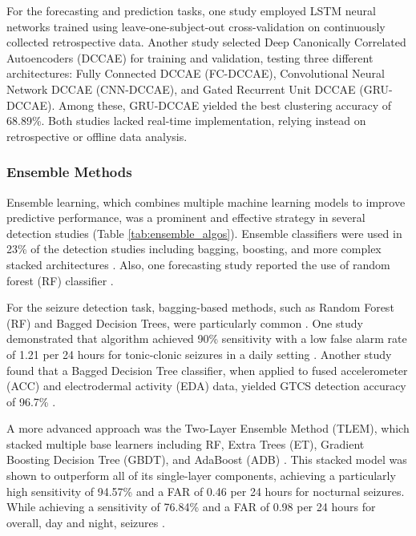 For the forecasting and prediction tasks, one study \cite{Meisel2020-ii} employed LSTM neural networks trained using leave-one-subject-out cross-validation on continuously collected retrospective data. Another study \cite{Vieluf2023-ta} selected Deep Canonically Correlated Autoencoders (DCCAE) for training and validation, testing three different architectures: Fully Connected DCCAE (FC-DCCAE), Convolutional Neural Network DCCAE (CNN-DCCAE), and Gated Recurrent Unit DCCAE (GRU-DCCAE). Among these, GRU-DCCAE yielded the best clustering accuracy of 68.89\%. Both studies lacked real-time implementation, relying instead on retrospective or offline data analysis.


\subsubsection{Ensemble Methods}
Ensemble learning, which combines multiple machine learning models to improve predictive performance, was a prominent and effective strategy in several detection studies (Table \ref{tab:ensemble_algos}). Ensemble classifiers were used in 23\% of the detection studies  including bagging, boosting, and more complex stacked architectures \cite{Wang2022-lt, Chowdhury2022-bi, Vakilna2024-hk, Dong2022-oo, Jiang2022-zu, Wu2024-yl}. Also, one forecasting study reported the use of random forest (RF) classifier \cite{Vieluf2023-zv}.

For the seizure detection task, bagging-based methods, such as Random Forest (RF) and Bagged Decision Trees, were particularly common \cite{Chowdhury2022-bi, Wang2022-lt, Wu2024-yl, Vakilna2024-hk}. One study demonstrated that  algorithm achieved 90\% sensitivity with a low false alarm rate of 1.21 per 24 hours for tonic-clonic seizures in a daily setting \cite{Wang2022-lt}. Another study found that a Bagged Decision Tree classifier, when applied to fused accelerometer (ACC) and electrodermal activity (EDA) data, yielded GTCS detection accuracy of 96.7\% \cite{Chowdhury2022-bi}.

A more advanced approach was the Two-Layer Ensemble Method (TLEM), which stacked multiple base learners including RF, Extra Trees (ET), Gradient Boosting Decision Tree (GBDT), and AdaBoost (ADB) \cite{Dong2022-oo}. This stacked model was shown to outperform all of its single-layer components, achieving a particularly high sensitivity of 94.57\% and a FAR of 0.46 per 24 hours for nocturnal seizures. While achieving a sensitivity of 76.84\% and a FAR of 0.98 per 24 hours for overall, day and night, seizures \cite{Dong2022-oo}.

